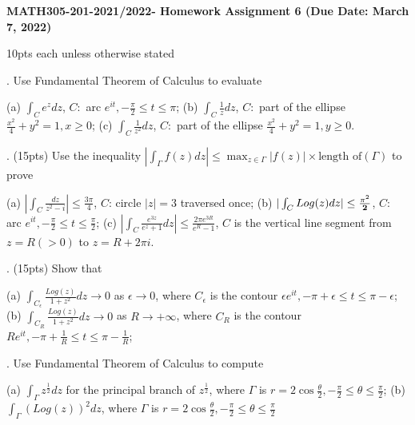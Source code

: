 %
%
\textwidth=6.8in
\textheight=8.8in
\oddsidemargin=-0.1in
\evensidemargin=-0.1in








\noindent
{\bf MATH305-201-2021/2022- Homework Assignment 6 (Due Date: March 7, 2022) }

\vskip 0.5cm

 10pts each unless otherwise stated

. Use Fundamental Theorem of Calculus to evaluate

(a) $\int_{C} e^z dz$, $C:$ arc $ e^{it}, -\frac{\pi}{2} \leq t \leq  \pi$; (b)   $\int_{C} \frac{1}{z} dz$, $C:$ part of the ellipse $ \frac{x^2}{4}+ y^2=1, x \geq 0$; (c) $ \int_{C} \frac{1}{ z^2} dz$, $C:$ part of the ellipse $ \frac{x^2}{4}+ y^2=1, y \geq 0$.



\medskip

. (15pts)  Use the inequality $ |\int_{\Gamma} f(z) dz| \leq \max_{z \in \Gamma} |f(z)| \times \mbox{length of} ( \Gamma)$ to prove

(a) $ | \int_{ C} \frac{dz}{ z^2-i} | \leq \frac{3\pi}{4}$, $C$: circle $ |z|=3$ traversed once; (b) $ |\int_{C} Log (z) dz | \leq \frac{\pi^2}{{\bf 2}}$, $C:$ arc $ e^{it}, -\frac{\pi}{2} \leq t \leq \frac{\pi}{2}$; (c) $ |\int_{C} \frac{e^{3z}}{e^z+1} dz|\leq \frac{2\pi e^{3R}}{e^R-1}$, $C$ is the vertical line segment from $z=R (>0)$ to $ z= R+ 2\pi i $.



\medskip

. (15pts) Show that

(a) $ \int_{C_\epsilon } \frac{ Log (z) }{1+z^2} dz  \to 0 $ as $\epsilon \to 0$, where $ C_\epsilon  $ is the contour $ \epsilon e^{i t}, -\pi + \epsilon  \leq  t \leq  \pi -\epsilon $; (b) $ \int_{C_R } \frac{ Log (z) }{1+z^2} dz  \to 0 $ as $R \to +\infty $, where $ C_R $ is the contour $ R e^{i t}, -\pi + \frac{1}{R}   \leq  t \leq  \pi -\frac{1}{R} $;


\medskip

. Use Fundamental Theorem of Calculus to compute

(a) $ \int_{ \Gamma} z^{\frac{1}{2}} dz $ for the principal branch  of $ z^{\frac{1}{2}}$, where $ \Gamma $ is $ r= 2 \cos \frac{\theta}{2}, -\frac{\pi}{2} \leq \theta \leq \frac{\pi}{2}$; (b) $ \int_{\Gamma} (Log (z))^2 dz$, where $ \Gamma $ is $ r= 2 \cos \frac{\theta}{2}, -\frac{\pi}{2} \leq \theta \leq \frac{\pi}{2}$


